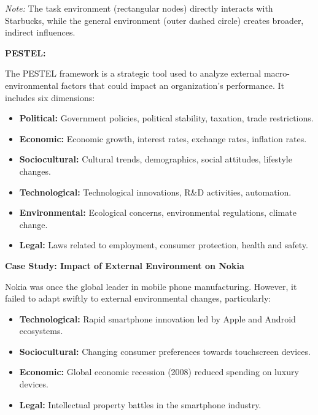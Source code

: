\documentclass[10pt,a4paper]{book}
\begin{document}
\textit{Note:} The task environment (rectangular nodes) directly interacts with Starbucks, while the general environment (outer dashed circle) creates broader, indirect influences.

\vspace{1cm}

\textbf{PESTEL:}

The PESTEL framework is a strategic tool used to analyze external macro-environmental factors that could impact an organization's performance. It includes six dimensions:

\begin{itemize}
    \item \textbf{Political:} Government policies, political stability, taxation, trade restrictions.
    \item \textbf{Economic:} Economic growth, interest rates, exchange rates, inflation rates.
    \item \textbf{Sociocultural:} Cultural trends, demographics, social attitudes, lifestyle changes.
    \item \textbf{Technological:} Technological innovations, R\&D activities, automation.
    \item \textbf{Environmental:} Ecological concerns, environmental regulations, climate change.
    \item \textbf{Legal:} Laws related to employment, consumer protection, health and safety.
\end{itemize}

\vspace{0.5cm}

\textbf{Case Study: Impact of External Environment on Nokia}

Nokia was once the global leader in mobile phone manufacturing. However, it failed to adapt swiftly to external environmental changes, particularly:

\begin{itemize}
    \item \textbf{Technological:} Rapid smartphone innovation led by Apple and Android ecosystems.
    \item \textbf{Sociocultural:} Changing consumer preferences towards touchscreen devices.
    \item \textbf{Economic:} Global economic recession (2008) reduced spending on luxury devices.
    \item \textbf{Legal:} Intellectual property battles in the smartphone industry.
\end{itemize}
\end{document}
